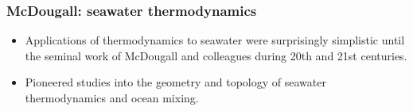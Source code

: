 \documentclass[10pt]{beamer}
\begin{document}
\begin{frame}
  \frametitle{McDougall: seawater thermodynamics}

\begin{center}
\vspace{-.25cm}
\hspace{2cm} 

\vspace{-.3cm}

\end{center}

\begin{exampleblock}{}
\begin{itemize}

\item Applications of thermodynamics to seawater were surprisingly
  simplistic until the seminal work of McDougall and colleagues during
  20th and 21st centuries.

\item Pioneered studies into the geometry and topology of seawater
  thermodynamics and ocean mixing.

\end{itemize}
\end{exampleblock}{}
\end{frame}
\end{document}
